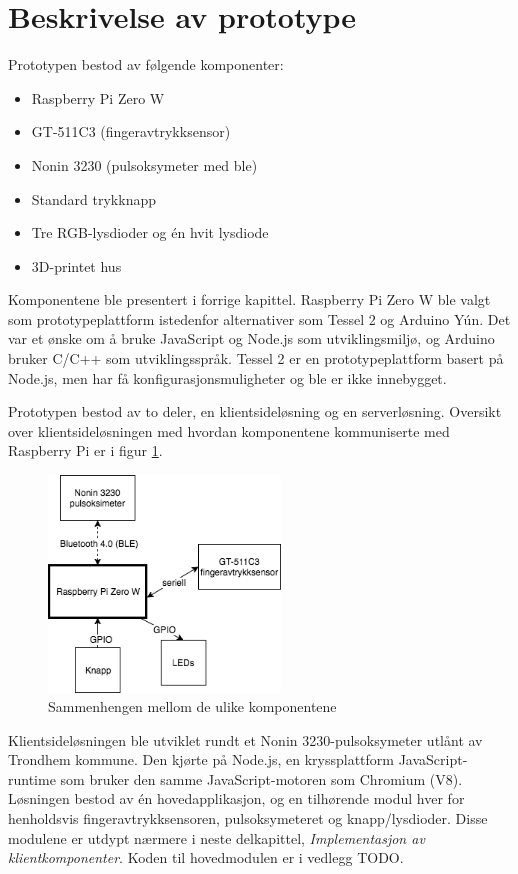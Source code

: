 
\section{Beskrivelse av prototype}
Prototypen bestod av følgende komponenter:

\begin{itemize}
  \item Raspberry Pi Zero W
  \item GT-511C3 (fingeravtrykksensor)
  \item Nonin 3230 (pulsoksymeter med \gls{ble})
  \item Standard trykknapp
  \item Tre RGB-lysdioder og én hvit lysdiode
  \item 3D-printet hus
\end{itemize}

Komponentene ble presentert i forrige kapittel. Raspberry Pi Zero W ble valgt som prototypeplattform istedenfor
alternativer som Tessel 2 og Arduino Yún. Det var et ønske om å bruke JavaScript og Node.js som utviklingsmiljø, og Arduino
bruker C/C++ som utviklingsspråk. Tessel 2 er en prototypeplattform basert på Node.js, men har få konfigurasjonsmuligheter
og \gls{ble} er ikke innebygget.

Prototypen bestod av to deler, en klientsideløsning og en serverløsning.
Oversikt over klientsideløsningen med hvordan komponentene kommuniserte med Raspberry Pi er i figur \ref{fig:prototypeoversikt}.
\begin{figure}
\includegraphics[width=0.55\textwidth, center]{fig/prototype/oversiktlosning}
\caption{Sammenhengen mellom de ulike komponentene}
\label{fig:prototypeoversikt}
\end{figure}

Klientsideløsningen ble utviklet rundt
et Nonin 3230-pulsoksymeter utlånt av Trondhem kommune. Den kjørte på Node.js, en kryssplattform JavaScript-runtime som bruker den
samme JavaScript-motoren som Chromium (V8). Løsningen bestod av én hovedapplikasjon, og en tilhørende modul hver for henholdsvis fingeravtrykksensoren,
pulsoksymeteret og knapp/lysdioder. Disse modulene er utdypt nærmere i neste delkapittel, \textit{Implementasjon av klientkomponenter}.
Koden til hovedmodulen er i vedlegg TODO.

